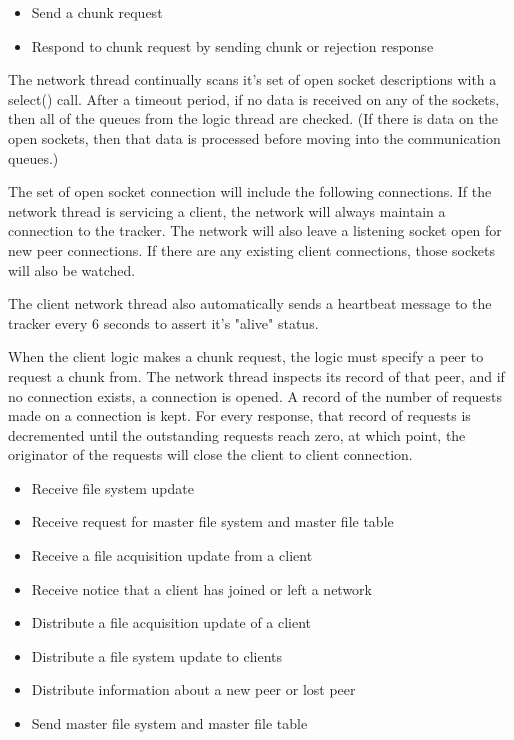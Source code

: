 \begin{itemize}
	\item Send a chunk request
	\item Respond to chunk request by sending chunk or rejection response
\end{itemize}

The network thread continually scans it's set of open socket descriptions with a select() call. After a timeout period, if no data is received on any of the sockets, then all of the queues from the logic thread are checked. (If there is data on the open sockets, then that data is processed before moving into the communication queues.)

The set of open socket connection will include the following connections. If the network thread is servicing a client, the network will always maintain a connection to the tracker. The network will also leave a listening socket open for new peer connections. If there are any existing client connections, those sockets will also be watched. 

The client network thread also automatically sends a heartbeat message to the tracker every 6 seconds to assert it's "alive" status.

When the client logic makes a chunk request, the logic must specify a peer to request a chunk from. The network thread inspects its record of that peer, and if no connection exists, a connection is opened. A record of the number of requests made on a connection is kept. For every response, that record of requests is decremented until the outstanding requests reach zero, at which point, the originator of the requests will close the client to client connection.


\begin{itemize}
	\item Receive file system update
	\item Receive request for master file system and master file table
	\item Receive a file acquisition update from a client
	\item Receive notice that a client has joined or left a network
\end{itemize}

\begin{itemize}
	\item Distribute a file acquisition update of a client
	\item Distribute a file system update to clients
	\item Distribute information about a new peer or lost peer
	\item Send master file system and master file table
\end{itemize}

